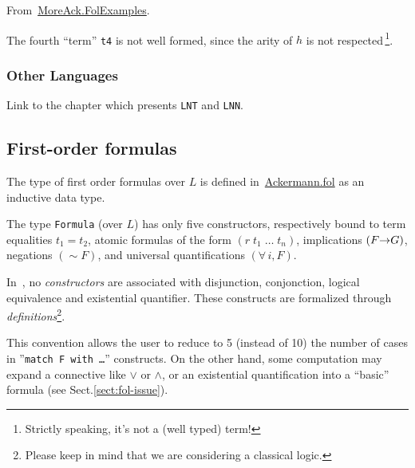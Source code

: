 From~\href{../theories/html/hydras.MoreAck.FolExamples.html}{MoreAck.FolExamples}.



\begin{remark}
The fourth ``term'' \texttt{t4} is not well formed, since the arity of $h$ is not respected\,\footnote{Strictly speaking, it's not a (well typed) term!}.
\end{remark}

\subsubsection{Other Languages}

\begin{todo}
Link to the chapter which presents \texttt{LNT} and \texttt{LNN}.
\end{todo}

\subsection{First-order formulas}



The type of first order formulas over $L$ is defined 
in~\href{../theories/html/hydras.Ackermann.fol.html}{Ackermann.fol} as an inductive data type.


\begin{remark}
The type \texttt{Formula} (over $L$) has only five constructors,
respectively bound to term equalities $t_1=t_2$, atomic formulas of the form $(r\;t_1\;\dots\;t_n)$, implications $(F \mbox{$\rightarrow$} G)$, negations $({\sim}F)$, and universal quantifications $(\forall\,i, F)$.  

In~\cite{Goedel}, no \emph{constructors} are associated with
disjunction, conjonction, logical equivalence and existential quantifier. These constructs are formalized through \emph{definitions}\footnote{Please keep in mind that we are considering a classical logic.}.


This convention allows the user to reduce to 5 (instead of 10) the number of cases in ''\texttt{match F with \dots}'' constructs. On the other hand, some computation may expand a connective like $\vee$ or
$\wedge$, or an existential quantification into a ``basic'' formula (see Sect.\vref{sect:fol-issue}).
\end{remark}

